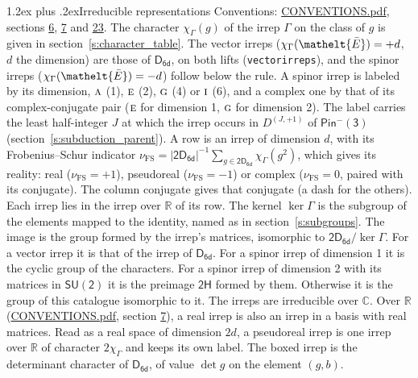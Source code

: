 \documentclass[10pt,a4paper]{article}
\makeatletter
\renewcommand\section{\@startsection{section}{1}{\z@}{-3ex plus -1ex minus -.2ex}%
  {1.2ex plus .2ex}{\normalfont\large\sffamily\bfseries\color{parttitle}}}
\numberwithin{equation}{section}
\newcommand{\eltfont}[1]{{\let\sigma\eltsigma\mathelt{#1}}}
\newcommand{\grp}[1]{\mathsf{#1}}
\newcommand{\irr}[1]{\text{\normalfont\scshape #1}}
\newcommand{\elt}[1]{\eltfont{#1}}
\newcommand{\irrJp}[2]{D^{(#1,#2)}}
\newcommand{\irchar}[1]{\chi_{#1}}
\newcommand{\fsind}{\nu_{\mathrm{FS}}}
\newcommand{\barred}[1]{\bar{#1}}
\makeatother
\begin{document}
\section{Irreducible representations}\label{s:irreps}
Conventions: \href{../../CONVENTIONS.pdf}{CONVENTIONS.pdf}, sections \href{../../../rotation/CONVENTIONS.pdf\#conv.6}{6}, \href{../../../rotation/CONVENTIONS.pdf\#conv.7}{7} and \href{../../CONVENTIONS.pdf\#conv.23}{23}.
\leavevmode\label{n:function.character}\label{n:irrep.Gamma}The character $\irchar{\Gamma}(g)$ of the irrep $\Gamma$ on the class of $g$ is given in section~\ref{s:character_table}. \label{n:index.dimension}The vector irreps ($\irchar{\Gamma}(\elt{\barred{E}}) = +d$, $d$ the dimension) are those of \href{../../../rotation/data/pdf/D6d.pdf}{$\grp{D_{6d}}$}, on both lifts (\texttt{vectorirreps}), and the spinor irreps ($\irchar{\Gamma}(\elt{\barred{E}}) = -d$) follow below the rule. A spinor irrep is labeled by its dimension, $\irr{a}$ (1), $\irr{e}$ (2), $\irr{g}$ (4) or $\irr{i}$ (6), and a complex one by that of its complex-conjugate pair ($\irr{e}$ for dimension 1, $\irr{g}$ for dimension 2). The label carries the least half-integer $J$ at which the irrep occurs in $\irrJp{J}{+1}$ of $\grp{Pin^{-}(3)}$ (section~\ref{s:subduction_parent}).
\leavevmode\label{n:index.frobenius}\label{n:head.irrep}\label{n:head.reality}A row is an irrep of dimension $d$, with its Frobenius--Schur indicator $\fsind = |\grp{2D_{6d}}|^{-1}\allowbreak\sum_{g\in\grp{2D_{6d}}}\irchar{\Gamma}(g^2)$, which gives its reality: real ($\fsind = +1$), pseudoreal ($\fsind = -1$) or complex ($\fsind = 0$, paired with its conjugate). \label{n:head.conjugate}The column conjugate gives that conjugate (a dash for the others). \label{n:head.over.real}Each irrep lies in the irrep over $\mathbb{R}$ of its row. \label{n:head.kernel}The kernel $\ker\Gamma$ is the subgroup of the elements mapped to the identity, named as in section~\ref{s:subgroups}. \label{n:head.image}The image is the group formed by the irrep's matrices, isomorphic to $\grp{2D_{6d}}/\ker\Gamma$. For a vector irrep it is that of the irrep of \href{../../../rotation/data/pdf/D6d.pdf}{$\grp{D_{6d}}$}. For a spinor irrep of dimension 1 it is the cyclic group of the characters. For a spinor irrep of dimension 2 with its matrices in $\grp{SU(2)}$ it is the preimage $\grp{2H}$ formed by them. Otherwise it is the group of this catalogue isomorphic to it. The irreps are irreducible over $\mathbb{C}$. Over $\mathbb{R}$ (\href{../../CONVENTIONS.pdf}{CONVENTIONS.pdf}, section \href{../../../rotation/CONVENTIONS.pdf\#conv.7}{7}), a real irrep is also an irrep in a basis with real matrices. Read as a real space of dimension $2d$, a pseudoreal irrep is one irrep over $\mathbb{R}$ of character $2\irchar{\Gamma}$ and keeps its own label. \label{n:mark.determinant}The boxed irrep is the determinant character of \href{../../../rotation/data/pdf/D6d.pdf}{$\grp{D_{6d}}$}, of value $\det g$ on the element $(g, b)$.
\end{document}
